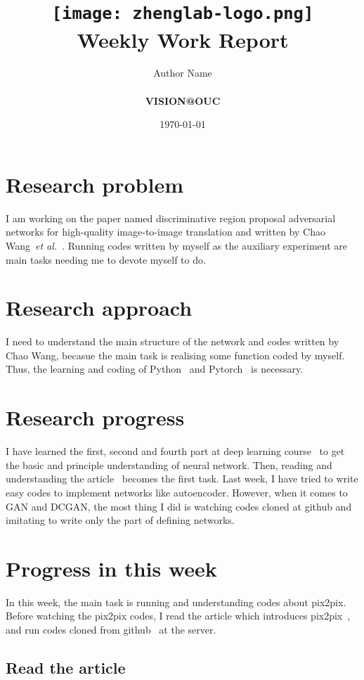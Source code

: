 \documentclass[a4paper]{article}
\title{
    \vspace*{1in}
    \texttt{[image: zhenglab-logo.png]}\\
    \vspace*{1.2in}
    \textbf{\huge Weekly Work Report}
    \vspace{0.2in}
}
\author{Author Name \\
    \vspace*{0.5in} \\
    \textbf{VISION@OUC} \\
    \vspace*{1in}
}
\date{\today}
\begin{document}
\maketitle
\setcounter{page}{0}
\thispagestyle{empty}
\newpage
\section{Research problem}

I am working on the paper named discriminative region proposal adversarial networks for high-quality image-to-image translation and written by Chao Wang~\emph{et al.}~\cite{dis}. Running codes written by myself as the auxiliary experiment are main tasks needing me to devote myself to do.

\section{Research approach}

I need to understand the main structure of the network and codes written by Chao Wang, becasue the main task is realising some function coded by myself. Thus, the learning and coding of Python~\cite{Xuefeng} and Pytorch~\cite{bilibili} is necessary.

\section{Research progress}

I have learned the first, second and fourth part at deep learning course~\cite{Neural} to get the basic and principle understanding of neural network. Then, reading and understanding the article~\cite{dis} becomes the first task. Last week, I have tried to write easy codes to implement networks like autoencoder. However, when it comes to GAN and DCGAN, the most thing I did is watching codes cloned at github and imitating to write only the part of defining networks. 

\section{Progress in this week} 

In this week, the main task is running and understanding codes about pix2pix. Before watching the pix2pix codes, I read the article which introduces pix2pix~\cite{Image}, and run codes cloned from github~\cite{Git} at the server.

\subsection{Read the article}
\end{document}
